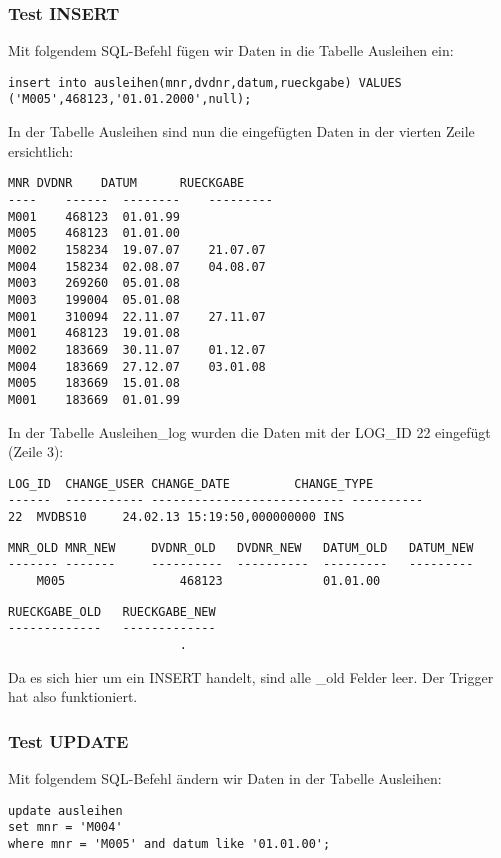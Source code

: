 \documentclass[11pt,a4paper,parskip=half]{scrartcl}
\begin{document}
\subsubsection{Test INSERT}
Mit folgendem SQL-Befehl fügen wir Daten in die Tabelle Ausleihen ein:

\begin{lstlisting}
insert into ausleihen(mnr,dvdnr,datum,rueckgabe) VALUES ('M005',468123,'01.01.2000',null);
\end{lstlisting}

In der Tabelle Ausleihen sind nun die eingefügten Daten in der vierten Zeile ersichtlich:

\begin{lstlisting}
MNR	DVDNR	 DATUM		RUECKGABE
---- 	------	-------- 	---------
M001	468123 	01.01.99	
M005	468123	01.01.00	
M002	158234 	19.07.07	21.07.07  
M004	158234 	02.08.07	04.08.07  
M003	269260 	05.01.08	
M003	199004 	05.01.08	
M001	310094 	22.11.07	27.11.07  
M001	468123 	19.01.08	
M002	183669 	30.11.07	01.12.07  
M004	183669 	27.12.07	03.01.08  
M005	183669 	15.01.08	
M001	183669	01.01.99	
\end{lstlisting}

In der Tabelle Ausleihen\_log wurden die Daten mit der LOG\_ID 22 eingefügt (Zeile 3):

\begin{lstlisting}
LOG_ID	CHANGE_USER	CHANGE_DATE			CHANGE_TYPE	
------	-----------	---------------------------	----------		
22	MVDBS10		24.02.13 15:19:50,000000000	INS					
\end{lstlisting}

\begin{lstlisting}
MNR_OLD	MNR_NEW		DVDNR_OLD	DVDNR_NEW	DATUM_OLD	DATUM_NEW	
-------	-------		----------	----------	---------	--------- 	
	M005				468123				01.01.00					
\end{lstlisting}
\begin{lstlisting}
RUECKGABE_OLD	RUECKGABE_NEW
-------------	-------------	
						.
\end{lstlisting}

Da es sich hier um ein INSERT handelt, sind alle \_old Felder leer. Der Trigger hat also funktioniert.

\subsubsection{Test UPDATE}
Mit folgendem SQL-Befehl ändern wir Daten in der Tabelle Ausleihen:

\begin{lstlisting}
update ausleihen
set mnr = 'M004'
where mnr = 'M005' and datum like '01.01.00';
\end{lstlisting}
\end{document}
